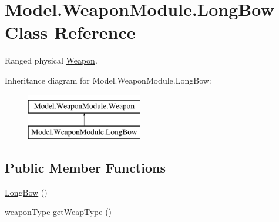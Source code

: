 \hypertarget{class_model_1_1_weapon_module_1_1_long_bow}{}\section{Model.\+Weapon\+Module.\+Long\+Bow Class Reference}
\label{class_model_1_1_weapon_module_1_1_long_bow}


Ranged physical \hyperlink{interface_model_1_1_weapon_module_1_1_weapon}{Weapon}.  


Inheritance diagram for Model.\+Weapon\+Module.\+Long\+Bow\+:\begin{figure}[H]
\begin{center}
\leavevmode
\includegraphics[height=2.000000cm]{class_model_1_1_weapon_module_1_1_long_bow}
\end{center}
\end{figure}
\subsection*{Public Member Functions}
\begin{DoxyCompactItemize}
\item 
\hyperlink{class_model_1_1_weapon_module_1_1_long_bow_adbd4822fe9ff1519a2c226f0a1e8ee85}{Long\+Bow} ()
\item 
\hyperlink{namespace_model_1_1_weapon_module_a3390c266f89e3399c2bc7fa31f13cbec}{weapon\+Type} \hyperlink{class_model_1_1_weapon_module_1_1_long_bow_aca2986d43dcefb1f3d99c6507a4390cd}{get\+Weap\+Type} ()
\end{DoxyCompactItemize}
